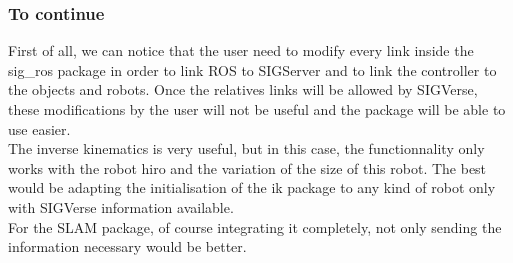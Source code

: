 \subsubsection{To continue}
First of all, we can notice that the user need to modify every link inside the sig\_ros package in order to link ROS to SIGServer and to link the controller to the objects and robots. Once the relatives links will be allowed by SIGVerse, these modifications by the user will not be useful and the package will be able to use easier.\\
The inverse kinematics is very useful, but in this case, the functionnality only works with the robot hiro and the variation of the size of this robot. The best would be adapting the initialisation of the ik package to any kind of robot only with SIGVerse information available.\\
For the SLAM package, of course integrating it completely, not only sending the information necessary would be better.


